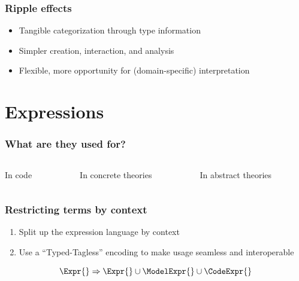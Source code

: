 \documentclass[xcolor={dvipsnames}]{beamer}
\begin{document}
\begin{frame}
  \frametitle{Ripple effects}

  \begin{itemize}
    \item Tangible categorization through type information
    \item Simpler creation, interaction, and analysis
    \item Flexible, more opportunity for (domain-specific) interpretation
  \end{itemize}

\end{frame}

\section{Expressions}

\begin{frame}
  \frametitle{What are they used for?}

  \begin{columns}
    \begin{column}{0.3\textwidth}
      \missingfigure{}
      In code
    \end{column}
    \hfill
    \begin{column}{0.3\textwidth}
      \missingfigure{}
      In concrete theories
    \end{column}
    \hfill
    \begin{column}{0.3\textwidth}
      \missingfigure{}
      In abstract theories
    \end{column}
  \end{columns}
\end{frame}

\begin{frame}
  \frametitle{Restricting terms by context}

  \begin{enumerate}
    \item Split up the expression language by context
    \item Use a ``Typed-Tagless'' encoding to make usage seamless and
          interoperable
  \end{enumerate}

  \[\Expr{} \Rightarrow{} \Expr{} \cup{} \ModelExpr{} \cup{} \CodeExpr{}\]

\end{frame}
\end{document}
